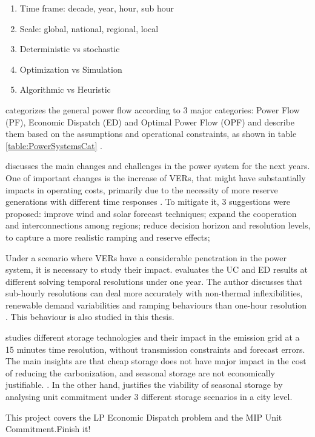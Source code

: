 \documentclass[12pt,LUDisStyle,twosided]{book}
\begin{document}
\begin{enumerate}
\item Time frame: decade, year, hour, sub hour 
\item Scale: global, national, regional, local
\item Deterministic vs stochastic
\item Optimization vs Simulation
\item Algorithmic vs Heuristic
\end{enumerate}

\citeauthor{cain} categorizes the general power flow according to 3 major categories: Power Flow (PF), Economic Dispatch (ED) and Optimal Power Flow (OPF) and describe them based on the assumptions and operational constraints, as shown in table \ref{table:PowerSystemsCat} \cite{cain}.

\citeauthor{kassakian} discusses the main changes and challenges in the power system for the next years. One of important changes is the increase of VERs, that might have substantially impacts in operating costs, primarily due to the necessity of more reserve generations with different time responses \cite{kassakian}. To mitigate it, 3 suggestions were proposed: improve wind and solar forecast techniques; expand the cooperation and interconnections among regions; reduce decision horizon and resolution levels, to capture a more realistic ramping and reserve effects;


Under a scenario where VERs have a considerable penetration in the power system, it is necessary to study their impact. \citeauthor{deane} evaluates the UC and ED results at different solving temporal resolutions under one year. The author discusses that sub-hourly resolutions can deal more accurately with non-thermal inflexibilities, renewable demand variabilities and ramping behaviours than one-hour resolution \cite{deane}. This behaviour is also studied in this thesis.

\citeauthor{safaei} studies different storage technologies and their impact in the emission grid at a 15 minutes time resolution, without transmission constraints and forecast errors. The main insights are that cheap storage does not have major impact in the cost of reducing the carbonization, and seasonal storage are not economically justifiable. \cite{safaei}. In the other hand, \citeauthor{harris} justifies the viability of seasonal storage by analysing unit commitment under 3 different storage scenarios in a city level.

This project covers the LP Economic Dispatch problem and the MIP Unit Commitment.Finish it!
\end{document}
